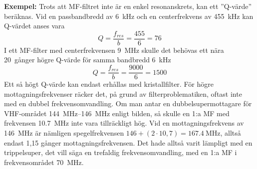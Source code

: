 \textbf{Exempel:}
Trots att MF-filtret inte är en enkel resonanskrets, kan ett ''Q-värde''
beräknas.
Vid en passbandbredd av \qty{6}{\kilo\hertz} och en centerfrekvens av
\qty{455}{\kilo\hertz} kan Q-värdet anses vara
\[ Q = \frac{f_{\textit{res}}}{b} = \frac{455}{6} = 76 \]
I ett MF-filter med centerfrekvensen \qty{9}{\mega\hertz} skulle det behövas ett
nära 20~gånger högre Q-värde för samma bandbredd \qty{6}{\kilo\hertz}
\[ Q = \frac{f_{\textit{res}}}{b} = \frac{9000}{6} = 1500 \]
Ett så högt Q-värde kan endast erhållas med kristallfilter.
För högre mottagningsfrekvenser räcker det, på grund av filterproblematiken,
oftast inte med en dubbel frekvensomvandling.
Om man antar en dubbelsupermottagare för VHF-området
\SIrange{144}{146}{\mega\hertz} enligt bilden, så skulle en 1:a MF med
frekvensen \qty{10,7}{\mega\hertz} inte vara tillräckligt hög.
Vid en mottagningsfrekvens av \qty{146}{\mega\hertz} är nämligen spegelfrekvensen
\(146 + (2 \cdot 10,7) = \qty{167,4}{\mega\hertz}\), alltså endast 1,15 gånger
mottagningsfrekvensen.
Det hade alltså varit lämpligt med en trippelsuper, det vill säga en trefaldig
frekvensomvandling, med en 1:a MF i frekvensområdet \qty{70}{\mega\hertz}.
